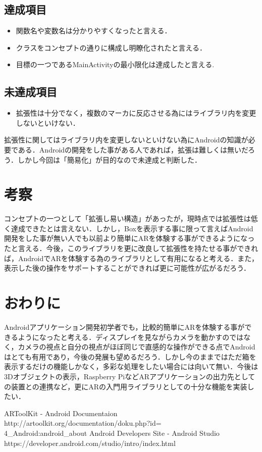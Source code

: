 \documentclass[twocolumn,10pt,a4j]{jsarticle}
\begin{document}
\subsection{達成項目}
\begin{itemize}
 \item 関数名や変数名は分かりやすくなったと言える．
 \item クラスをコンセプトの通りに構成し明瞭化されたと言える．
 \item 目標の一つであるMainActivityの最小限化は達成したと言える.
\end{itemize}
		
\subsection{未達成項目}
\begin{itemize}
 \item 拡張性は十分でなく，複数のマーカに反応させる為にはライブラリ内を変更しないといけない．
\end{itemize}
		
拡張性に関してはライブラリ内を変更しないといけない為にAndroidの知識が必要である．Androidの開発をした事がある人であれば，拡張は難しくは無いだろう．しかし今回は「簡易化」が目的なので未達成と判断した．
		

\section{考察}%
コンセプトの一つとして「拡張し易い構造」があったが，現時点では拡張性は低く達成できたとは言えない．しかし，Boxを表示する事に限って言えばAndroid開発をした事が無い人でも以前より簡単にARを体験する事ができるようになったと言える．今後，このライブラリを更に改良して拡張性を持たせる事ができれば，AndroidでARを体験する為のライブラリとして有用になると考える．また，表示した後の操作をサポートすることができれば更に可能性が広がるだろう．


\section{おわりに}%
 Androidアプリケーション開発初学者でも，比較的簡単にARを体験する事ができるようになったと考える．ディスプレイを見ながらカメラを動かすのではなく，カメラの視点と自分の視点がほぼ同じで直感的な操作ができる点でAndroidはとても有用であり，今後の発展も望めるだろう．しかし今のままではただ箱を表示するだけの機能しかなく，多彩な処理をしたい場合には向いて無い．今後は3Dオブジェクトの表示，Raspberry PiなどARアプリケーションの出力先としての装置との連携など，更にARの入門用ライブラリとしての十分な機能を実装したい．


\begin{thebibliography}{1}
	 ARToolKit - Android Documentaion\\
	 http://artoolkit.org/documentation/doku.php?id=\\4\_Android:android\_about
	 Android Developers Site - Android Studio\\
	 https://developer.android.com/studio/intro/index.html
\end{thebibliography}
\end{document}
